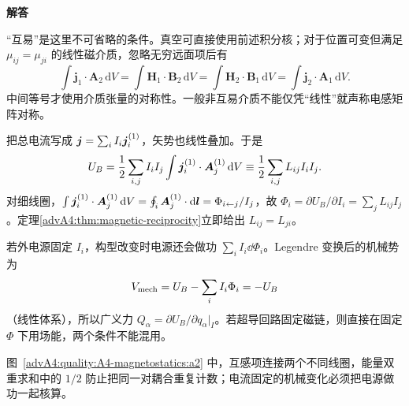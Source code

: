 \begin{advsolution}
\begin{center}\begin{minipage}{.96\linewidth}\centering
\raggedright{\bfseries\color{DeepBlue}解答}\par\smallskip\centering

\label{advA4:quality:A4-magnetostatics:a2}
\end{minipage}\end{center}

“互易”是这里不可省略的条件。真空可直接使用前述积分核；对于位置可变但满足 $\mu_{ij}=\mu_{ji}$ 的线性磁介质，忽略无穷远面项后有
\[
 \int\boldsymbol j_1\cdot\boldsymbol A_2\,\mathrm dV
 =\int\boldsymbol H_1\cdot\boldsymbol B_2\,\mathrm dV
 =\int\boldsymbol H_2\cdot\boldsymbol B_1\,\mathrm dV
 =\int\boldsymbol j_2\cdot\boldsymbol A_1\,\mathrm dV.
\]
中间等号才使用介质张量的对称性。一般非互易介质不能仅凭“线性”就声称电感矩阵对称。

把总电流写成 $\bm{j}=\sum_iI_i\bm{j}_i^{(1)}$，矢势也线性叠加。于是
\[
 U_B=\frac12\sum_{i,j}I_iI_j
 \int\bm{j}_i^{(1)}\cdot\bm{A}_j^{(1)}\mathop{}\!\mathrm d V
 \equiv\frac12\sum_{i,j}L_{ij}I_iI_j.
\]
对细线圈，$\int\bm{j}_i^{(1)}\cdot\bm{A}_j^{(1)}\mathop{}\!\mathrm d V
=\oint_i\bm{A}_j^{(1)}\cdot\mathop{}\!\mathrm d\bm{l}=\Phi_{i\leftarrow j}/I_j$，故
$\Phi_i=\partial U_B/\partial I_i=\sum_jL_{ij}I_j$。定理\ref{advA4:thm:magnetic-reciprocity}立即给出
$L_{ij}=L_{ji}$。

若外电源固定 $I_i$，构型改变时电源还会做功
$\sum_iI_i\dd\Phi_i$。Legendre 变换后的机械势为
\[
 V_{\rm mech}=U_B-\sum_iI_i\Phi_i=-U_B
\]
（线性体系），所以广义力
$Q_\alpha=\partial U_B/\partial q_\alpha|_I$。若超导回路固定磁链，则直接在固定 $\Phi$ 下用场能，两个条件不能混用。

图~\ref{advA4:quality:A4-magnetostatics:a2} 中，互感项连接两个不同线圈，能量双重求和中的 $1/2$ 防止把同一对耦合重复计数；电流固定的机械变化必须把电源做功一起核算。
\end{advsolution}

